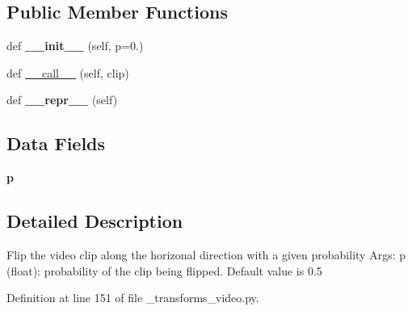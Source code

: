 \subsection*{Public Member Functions}
\begin{DoxyCompactItemize}
\item 
\mbox{\label{classtorchvision_1_1transforms_1_1__transforms__video_1_1RandomHorizontalFlipVideo_aba8d3a6b8d0ccceff9f0ad55bb033e4e}} 
def {\bfseries \+\_\+\+\_\+init\+\_\+\+\_\+} (self, p=0.)
\item 
def \hyperlink{classtorchvision_1_1transforms_1_1__transforms__video_1_1RandomHorizontalFlipVideo_a26dae6d5c1590be299747ea94b6aa4b8}{\+\_\+\+\_\+call\+\_\+\+\_\+} (self, clip)
\item 
\mbox{\label{classtorchvision_1_1transforms_1_1__transforms__video_1_1RandomHorizontalFlipVideo_a14f796b04769878c5fc61d8a2984a1f3}} 
def {\bfseries \+\_\+\+\_\+repr\+\_\+\+\_\+} (self)
\end{DoxyCompactItemize}
\subsection*{Data Fields}
\begin{DoxyCompactItemize}
\item 
\mbox{\label{classtorchvision_1_1transforms_1_1__transforms__video_1_1RandomHorizontalFlipVideo_a1eb9230cd2a9dc2551f93ff6118baadb}} 
{\bfseries p}
\end{DoxyCompactItemize}


\subsection{Detailed Description}
\begin{DoxyVerb}Flip the video clip along the horizonal direction with a given probability
Args:
    p (float): probability of the clip being flipped. Default value is 0.5
\end{DoxyVerb}
 

Definition at line 151 of file \+\_\+transforms\+\_\+video.\+py.



